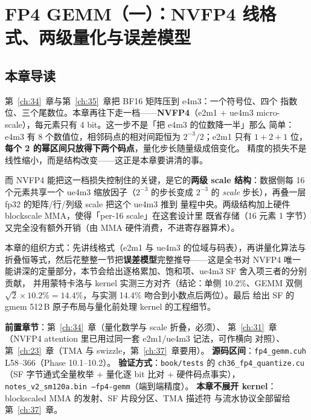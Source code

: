 \chapter{FP4 GEMM（一）：NVFP4 线格式、两级量化与误差模型}\label{ch:36}

\section{本章导读}

第~\ref{ch:34}~章与第~\ref{ch:35}~章把 BF16 矩阵压到 e4m3：一个符号位、四个
指数位、三个尾数位。本章再往下走一档——\textbf{NVFP4}（e2m1 + ue4m3
micro-scale），每元素只有 4 bit。这一步不是「把 e4m3 的位数降一半」那么
简单：e4m3 有 8 个数值位，相邻码点的相对间距恒为 $2^{-3}/2$；e2m1 只有
$1+2+1$ 位，\textbf{每个 2 的幂区间只放得下两个码点}，量化步长随量级成倍变化。
精度的损失不是线性缩小，而是结构改变——这正是本章要讲清的事。

而 NVFP4 能把这一档损失控制住的关键，是它的\textbf{两级 scale 结构}：数据侧每
16 个元素共享一个 ue4m3 缩放因子（$2^{-3}$ 的步长变成 $2^{-3}$ 的
\emph{scale} 步长），再叠一层 fp32 的矩阵/行/列级 scale 把这个 ue4m3 推到
量程中央。两级结构加上硬件 blockscale MMA，使得「per-16 scale」在这套设计里
既省存储（16 元素 1 字节）又完全没有额外开销（由 MMA 硬件消费，不进寄存器算术）。

本章的组织方式：先讲线格式（e2m1 与 ue4m3 的位域与码表），再讲量化算法与
折叠恒等式，然后花整整一节把\textbf{误差模型}完整推导——这是全书对 NVFP4 唯一
能讲深的定量部分，本节会给出逐格累加、饱和项、ue4m3 SF 舍入项三者的分别贡献，
并用蒙特卡洛与 kernel 实测三方对齐（结论：单侧 10.2\%、GEMM 双侧
$\sqrt{2}\times 10.2\% = 14.4\%$，与实测 14.4\% 吻合到小数点后两位）。最后
给出 SF 的 gmem 512\,B 原子布局与量化前处理 kernel 的工程细节。

\textbf{前置章节}：第~\ref{ch:34}~章（量化数学与 scale 折叠，必须）、
第~\ref{ch:31}~章（NVFP4 attention 里已用过同一套 e2m1/ue4m3 记法，可作横向
对照）、第~\ref{ch:23}~章（TMA 与 swizzle，第~\ref{ch:37}~章要用）。
\textbf{源码区间}：\texttt{fp4\_gemm.cuh} L58--366（Phase 10.1--10.2）。
\textbf{验证方式}：\texttt{book/tests} 的 \texttt{ch36\_fp4\_quantize.cu}
（SF 字节通式全量枚举 + 量化逐 bit 比对 + 硬件码点事实），
\texttt{notes\_v2\_sm120a.bin --fp4-gemm}（端到端精度）。
\textbf{本章不展开 kernel}：blockscaled MMA 的发射、SF 片段分区、TMA 描述符
与流水协议全部留给第~\ref{ch:37}~章。

